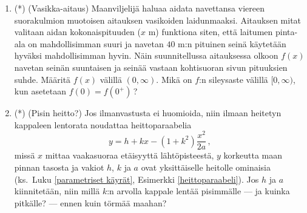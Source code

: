 \begin{enumerate}
\item (*) 
(Vasikka-aitaus) Maanviljelijä haluaa aidata navettansa viereen suorakulmion muotoisen 
aitauksen vasikoiden laidunmaaksi. Aitauksen mitat valitaan aidan kokonaispituuden ($x$ m) 
funktiona siten, että laitumen pinta-ala on mahdollisimman suuri ja navetan $40$ m:n pituinen
seinä käytetään hyväksi mahdollisimman hyvin. Näin suunnitellussa aitauksessa olkoon
$f(x)$ navetan seinän suuntaisen ja seinää vastaan kohtisuoran sivun pituuksien suhde.
Määritä $f(x)$ välillä $(0,\infty)$. Mikä on $f$:n sileysaste välillä $[0,\infty)$, kun
asetetaan $f(0)=f(0^+)$\,?

\item (*) 
(Pisin heitto?) Jos ilmanvastusta ei huomioida, niin ilmaan heitetyn kappaleen lentorata
noudattaa heittoparaabelia 
\[
y=h+kx-(1+k^2)\frac{x^2}{2a}\,,
\]
missä $x$ mittaa vaakasuoraa etäisyyttä lähtöpisteestä, $y$ korkeutta maan
pinnan tasosta ja vakiot $h$, $k$ ja $a$ ovat yksittäiselle heitolle ominaisia
(ks.\ Luku \ref{parametriset käyrät}, Esimerkki \ref{heittoparaabeli}). Jos
$h$ ja $a$ kiinnitetään, niin millä $k$:n arvolla kappale lentää pisimmälle --- ja kuinka
pitkälle? --- ennen kuin törmää maahan?

\end{enumerate}
